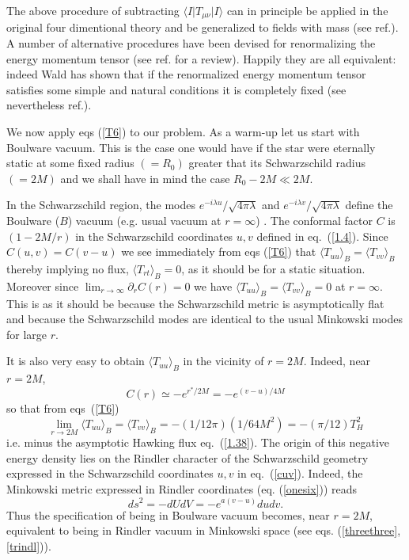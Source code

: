 \documentclass[12pt,oneside]{report}
\begin{document}
The above procedure of subtracting $\langle I \vert T_{\mu\nu} \vert I\rangle$
can in principle be applied in the original four dimentional
theory and be generalized to fields with mass (see ref.\cite{Massar}).
 A number of alternative procedures have been devised
for renormalizing the energy momentum tensor (see ref.\cite{BD} for a review).
Happily they are all equivalent: indeed Wald \cite{Wald2} has shown that if the
renormalized energy momentum tensor satisfies  some simple and natural
conditions it is completely fixed (see nevertheless ref.\cite {OttewillBrown}). 

 We now apply eqs (\ref{T6}) to our problem. As a warm-up let us start with Boulware
vacuum. This is the case one would have if the star were eternally static at
some fixed radius $ (= R_0)$ greater that its Schwarzschild radius $ (= 2M)$ and
we shall have in mind the case $ {R_0 - 2M} \ll 2M$.

In the Schwarzschild region, the modes $ e^{-i \lambda u}/ \sqrt{4 \pi \lambda}$
and $ e^{-i \lambda v}/ \sqrt{4 \pi \lambda}$ define the Boulware ($B$) vacuum
(e.g. usual vacuum at  $r=\infty$) . The conformal factor $C$ is  $  (1 - 2M /
r) $ in the Schwarzschild coordinates $u,v$ defined in eq.~(\ref{1.4}). Since $
C(u,v) = C(v-u) $ we see immediately from eqs (\ref{T6}) that $ \langle T_{uu}
\rangle_B = \langle T_{vv} \rangle_B $ thereby implying no flux, $ \langle
T_{rt} \rangle_B = 0 $,
 as it should be for a static situation. Moreover since $\lim_{ r \to \infty }
\partial_r C (r) = 0  $ we have $ \langle T_{uu}\rangle _{ B} = \langle T_{vv}
\rangle _{B} = 0$ at $ r = \infty $. This is  as it should  be because the
 Schwarzschild metric  is asymptotically flat and because the Schwarzschild 
modes are identical to the usual Minkowski modes for large $r$.

It is also very easy to obtain $ \langle T_{uu} \rangle_B$ in  the vicinity of $
r = 2M $. Indeed, near $ r = 2M $, \begin{equation}
 C(r) \simeq - e^{r^*/2M} = -e^{(v-u)/4M} \label{cuv} \end{equation}
 so that from eqs~(\ref{T6})  \begin{equation}
  \lim_{r \to 2M} \langle T_{uu} \rangle_B = \langle T_{vv} \rangle_B = - (1/12
\pi) (1/6 4 M^2) =- (\pi/12) T_{H}^{2} \label{minus} \end{equation} i.e. minus
the asymptotic Hawking flux eq.~(\ref{1.38}). The origin of this negative energy
density lies on the Rindler character of the Schwarzschild geometry expressed in
the Schwarzschild coordinates $u,v$ in eq.~(\ref{cuv}). Indeed, the Minkowski
metric expressed in Rindler  coordinates (eq. (\ref{onesix})) reads
\begin{equation} ds^2= -dU dV = - e^{a(v-u)} du dv. \end{equation} Thus the
specification of being in Boulware vacuum  becomes, near $r=2M$, equivalent
 to being in Rindler vacuum in Minkowski space (see eqs. (\ref{threethree},
\ref{trindl})).  
\end{document}
